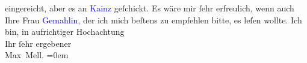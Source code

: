                     eingereicht, aber es an \textcolor{blue}{Kainz}{}\ledrightnote{\textcolor{blue}{Josef Kainz}} geſchickt.\pend
           \pstart
           Es wäre mir ſehr erfreulich, wenn auch Ihre Frau \textcolor{blue}{Gemahlin}{}, der ich mich beſtens zu empfehlen bitte, es
                    leſen wollte.\pend
           \pstart
           Ich bin, in aufrichtiger Hochachtung{\\[\baselineskip]}Ihr ſehr ergebener{\\[\baselineskip]}\spacefill\mbox{Max Mell.}\pend
           \leftskip=0em{}\endnumbering{}  
      